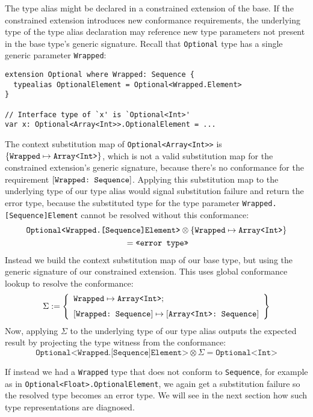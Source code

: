 \documentclass[../generics]{subfiles}
\begin{document}
The type alias might be declared in a constrained extension of the base. If the constrained extension introduces new conformance requirements, the underlying type of the type alias declaration may reference new type parameters not present in the base type's generic signature. Recall that \texttt{Optional} type has a single generic parameter \texttt{Wrapped}:
\begin{Verbatim}
extension Optional where Wrapped: Sequence {
  typealias OptionalElement = Optional<Wrapped.Element>
}

// Interface type of `x' is `Optional<Int>'
var x: Optional<Array<Int>>.OptionalElement = ...
\end{Verbatim}
The context substitution map of \texttt{Optional<Array<Int>>} is $\{\texttt{Wrapped} \mapsto \texttt{Array<Int>}\}$, which is not a valid substitution map for the constrained extension's generic signature, because there's no conformance for the requirement $[\texttt{Wrapped:~Sequence}]$. Applying this substitution map to the underlying type of our type alias would signal substitution failure and return the error type, because the substituted type for the type parameter \texttt{Wrapped.[Sequence]Element} cannot be resolved without this conformance:
\begin{multline*}\texttt{Optional<Wrapped.[Sequence]Element>}\otimes\{\texttt{Wrapped} \mapsto \texttt{Array<Int>}\}\\
{} =\texttt{<<error type>>}
\end{multline*}
Instead we build the context substitution map of our base type, but using the generic signature of our constrained extension. This uses global conformance lookup to resolve the conformance:
\[\Sigma := \SubstMapLongC{\SubstType{Wrapped}{Array<Int>}}{\SubstConf{Wrapped}{Array<Int>}{Sequence}}\]
Now, applying $\Sigma$ to the underlying type of our type alias outputs the expected result by projecting the type witness from the conformance:
\[\texttt{Optional<Wrapped.[Sequence]Element>}\otimes\Sigma = \texttt{Optional<Int>}\]

If instead we had a \texttt{Wrapped} type that does not conform to \texttt{Sequence}, for example as in \texttt{Optional<Float>.OptionalElement}, we again get a substitution failure so the resolved type becomes an error type. We will see in the next section how such type representations are diagnosed.

\smallskip
\end{document}
